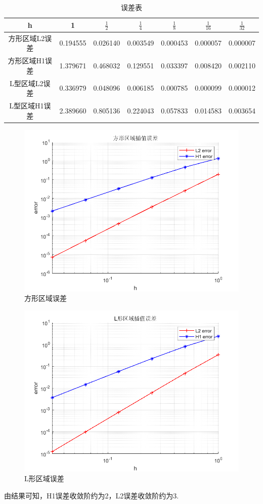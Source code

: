\documentclass[12pt,a4paper]{article}
\begin{document}
	\begin{table}[h]
		\centering
		\begin{tabular}{|c|c|c|c|c|c|c|}
			\hline
			h        & 1                 & $\frac{1}{2}$      & $\frac{1}{4}$       & $\frac{1}{8}$         & $\frac{1}{16}$        & $\frac{1}{32}$        \\ \hline
			方形区域L2误差 & 0.194555 & 0.026140 & 0.003549 & 0.000453 & 0.000057 & 0.000007 \\ \hline
			方形区域H1误差 & 1.379671  & 0.468032  & 0.129551   & 0.033397   & 0.008420  & 0.002110  \\ \hline
			L型区域L2误差 & 0.336979 & 0.048096 & 0.006185 & 0.000785 & 0.000099 & 0.000012 \\ \hline
			L型区域H1误差 & 2.389660  & 0.805136  & 0.224043   & 0.057833   & 0.014583   & 0.003654  \\ \hline
		\end{tabular}
		\caption{误差表}
	\end{table}
	
	\begin{figure}[h]
		\centering
		\includegraphics[width=0.9\linewidth]{sqrerror}
		\caption[方形区域误差]{方形区域误差}
		\label{fig:sqrerror}
	\end{figure}
	
	\begin{figure}[h]
		\centering
		\includegraphics[width=0.9\linewidth]{Lerror}
		\caption[L形区域误差]{L形区域误差}
		\label{fig:Lerror}
	\end{figure}
	
	由结果可知，H1误差收敛阶约为2，L2误差收敛阶约为3.
	
\end{document}
